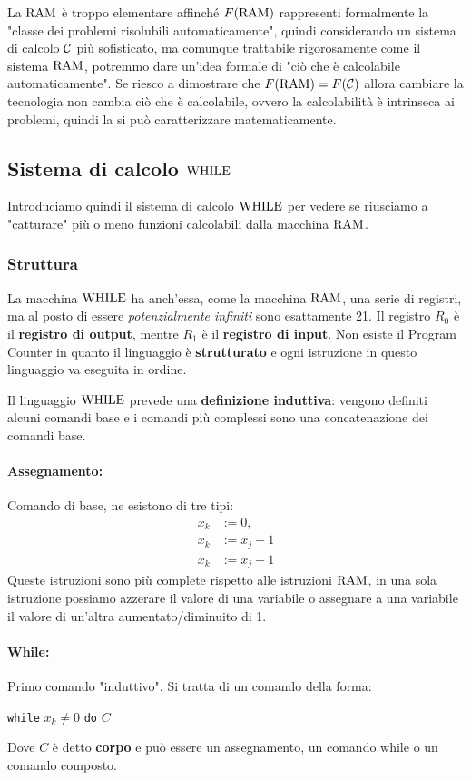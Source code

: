 La $\text{RAM}$ è troppo elementare affinché $F(\text{RAM})$ rappresenti formalmente la "classe dei problemi risolubili automaticamente", quindi considerando un sistema di calcolo $\mathcal{C}$ più sofisticato, ma comunque trattabile rigorosamente come il sistema $\text{RAM}$, potremmo dare un'idea formale di "ciò che è calcolabile automaticamente". Se riesco a dimostrare che $F(\text{RAM}) = F(\mathcal{C})$ allora cambiare la tecnologia non cambia ciò che è calcolabile, ovvero la calcolabilità è intrinseca ai problemi, quindi la si può caratterizzare matematicamente.

\subsection{Sistema di calcolo $\text{WHILE}$}
Introduciamo quindi il sistema di calcolo $\text{WHILE}$ per vedere se riusciamo a "catturare" più o meno funzioni calcolabili dalla macchina $\text{RAM}$.

\subsubsection{Struttura}
La macchina $\text{WHILE}$ ha anch'essa, come la macchina $\text{RAM}$, una serie di registri, ma al posto di essere \textit{potenzialmente infiniti} sono esattamente 21. Il registro $R_0$ è il \textbf{registro di output}, mentre $R_1$ è il \textbf{registro di input}. Non esiste il Program Counter in quanto il linguaggio è \textbf{strutturato} e ogni istruzione in questo linguaggio va eseguita in ordine.

Il linguaggio $\text{WHILE}$ prevede una \textbf{definizione induttiva}: vengono definiti alcuni comandi base e i comandi più complessi sono una concatenazione dei comandi base.

\paragraph{Assegnamento:} Comando di base, ne esistono di tre tipi: 
\begin{align*}
	x_k & := 0, \\
	x_k & := x_j + 1 \\
	x_k & := x_j \dotminus 1
\end{align*}
Queste istruzioni sono più complete rispetto alle istruzioni $\text{RAM}$, in una sola istruzione possiamo azzerare il valore di una variabile o assegnare a una variabile il valore di un'altra aumentato/diminuito di 1.

\paragraph{While:} Primo comando "induttivo". Si tratta di un comando della forma: 
\begin{center}
	\texttt{while} $x_k \neq 0$ \texttt{do} $C$
\end{center}
Dove $C$ è detto \textbf{corpo} e può essere un assegnamento, un comando while o un comando composto.

